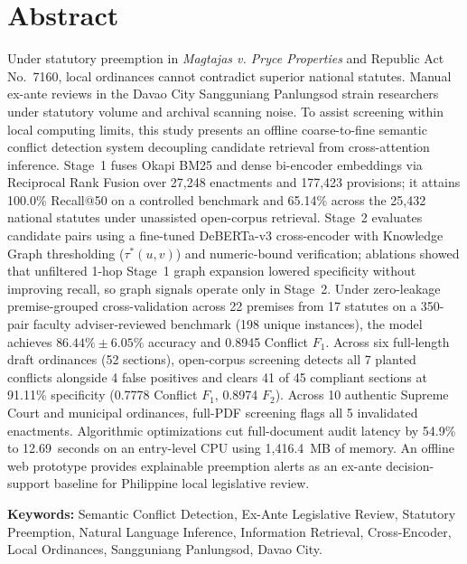\chapter*{Abstract}

Under statutory preemption in \textit{Magtajas v. Pryce Properties} and Republic Act No.~7160, local ordinances cannot contradict superior national statutes. Manual ex-ante reviews in the Davao City Sangguniang Panlungsod strain researchers under statutory volume and archival scanning noise. To assist screening within local computing limits, this study presents an offline coarse-to-fine semantic conflict detection system decoupling candidate retrieval from cross-attention inference. Stage~1 fuses Okapi BM25 and dense bi-encoder embeddings via Reciprocal Rank Fusion over 27,248 enactments and 177,423 provisions; it attains 100.0\% Recall@50 on a controlled benchmark and 65.14\% across the 25,432 national statutes under unassisted open-corpus retrieval. Stage~2 evaluates candidate pairs using a fine-tuned DeBERTa-v3 cross-encoder with Knowledge Graph thresholding ($\tau^*(u,v)$) and numeric-bound verification; ablations showed that unfiltered 1-hop Stage~1 graph expansion lowered specificity without improving recall, so graph signals operate only in Stage~2. Under zero-leakage premise-grouped cross-validation across 22 premises from 17 statutes on a 350-pair faculty adviser-reviewed benchmark (198 unique instances), the model achieves $86.44\% \pm 6.05\%$ accuracy and 0.8945 Conflict $F_1$. Across six full-length draft ordinances (52 sections), open-corpus screening detects all 7 planted conflicts alongside 4 false positives and clears 41 of 45 compliant sections at 91.11\% specificity (0.7778 Conflict $F_1$, 0.8974 $F_2$). Across 10 authentic Supreme Court and municipal ordinances, full-PDF screening flags all 5 invalidated enactments. Algorithmic optimizations cut full-document audit latency by 54.9\% to 12.69~seconds on an entry-level CPU using 1,416.4~MB of memory. An offline web prototype provides explainable preemption alerts as an ex-ante decision-support baseline for Philippine local legislative review.

\vspace{1.5em}
\noindent\textbf{Keywords:} Semantic Conflict Detection, Ex-Ante Legislative Review, Statutory Preemption, Natural Language Inference, Information Retrieval, Cross-Encoder, Local Ordinances, Sangguniang Panlungsod, Davao City.
